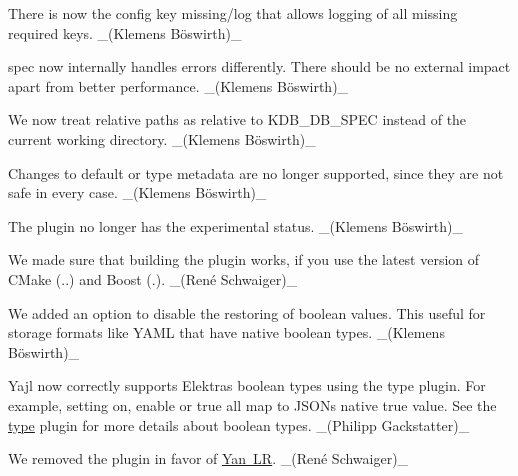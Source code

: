 \begin{DoxyItemize}
\item There is now the config key {\ttfamily missing/log} that allows logging of all missing {\ttfamily require}d keys. \+\_\+(Klemens Böswirth)\+\_\+
\item {\ttfamily spec} now internally handles errors differently. There should be no external impact apart from better performance. \+\_\+(Klemens Böswirth)\+\_\+
\end{DoxyItemize}


\begin{DoxyItemize}
\item We now treat relative paths as relative to {\ttfamily K\+D\+B\+\_\+\+D\+B\+\_\+\+S\+P\+EC} instead of the current working directory. \+\_\+(Klemens Böswirth)\+\_\+
\item Changes to {\ttfamily default} or {\ttfamily type} metadata are no longer supported, since they are not safe in every case. \+\_\+(Klemens Böswirth)\+\_\+
\item The plugin no longer has the {\ttfamily experimental} status. \+\_\+(Klemens Böswirth)\+\_\+
\end{DoxyItemize}


\begin{DoxyItemize}
\item We made sure that building the plugin works, if you use the latest version of C\+Make ({..}) and Boost ({.}). \+\_\+(René Schwaiger)\+\_\+
\end{DoxyItemize}


\begin{DoxyItemize}
\item We added an option to disable the restoring of boolean values. This useful for storage formats like Y\+A\+ML that have native boolean types. \+\_\+(Klemens Böswirth)\+\_\+
\end{DoxyItemize}


\begin{DoxyItemize}
\item Yajl now correctly supports Elektras boolean types using the {\ttfamily type} plugin. For example, setting {\ttfamily on}, {\ttfamily enable} or {\ttfamily true} all map to J\+S\+O\+Ns native {\ttfamily true} value. See the \mbox{\hyperlink{autotoc_md695_src_plugins_type_README_md}{type}} plugin for more details about boolean types. \+\_\+(\+Philipp Gackstatter)\+\_\+
\end{DoxyItemize}


\begin{DoxyItemize}
\item We removed the plugin in favor of \mbox{\hyperlink{autotoc_md861_src_plugins_yanlr_README_md}{Yan LR}}. \+\_\+(René Schwaiger)\+\_\+
\end{DoxyItemize}


